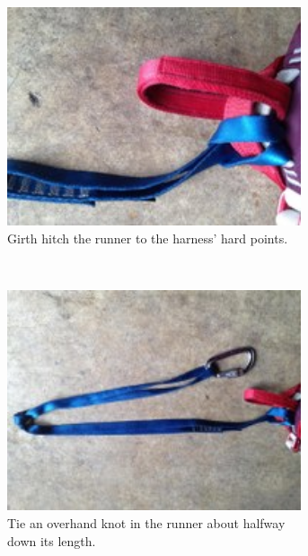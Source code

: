 \documentclass[nonacm,acmtog]{acmart}
\begin{document}
   \begin{figure}
      \centering
      \begin{subfigure}[t]{0.23\textwidth}
         \centering
         \includegraphics[width=0.95\textwidth]{images/int-step1.jpg}
         \caption{Girth hitch the runner to the harness' hard points.}
         \label{fig:int-step1}
      \end{subfigure}
      ~
      \begin{subfigure}[t]{0.23\textwidth}
         \centering
         \includegraphics[width=0.95\textwidth]{images/int-step2.jpg}
         \caption{
            Tie an overhand knot in the runner about halfway down its length.}
         \label{fig:int-step2}
      \end{subfigure}
      ~
      \begin{subfigure}[t]{0.23\textwidth}

\end{subfigure}
\end{figure}
\end{document}
